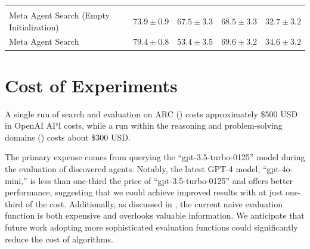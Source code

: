 \begin{table}[h]
{\begin{tabular}{>{\raggedright}p{6cm}cccc}
        \midrule
        \rowcolor{gray!20} \multicolumn{5}{>{\centering\arraybackslash}p{16.3cm}}{\textbf{\problemlong on Different Domains}} \vspace{0.1cm} \\
        Meta Agent Search (Empty Initialization) & \rule{0pt}{2.2ex}$73.9 \pm 0.9$ & $\mathbf{67.5 \pm 3.3}$ & $\mathbf{68.5 \pm 3.3}$ & $\mathbf{32.7 \pm 3.2}$ \\
        Meta Agent Search & \rule{0pt}{2.2ex}$\mathbf{79.4 \pm 0.8}$ & $53.4 \pm 3.5$ & $\mathbf{69.6 \pm 3.2}$ & $\mathbf{34.6 \pm 3.2}$ \\
        \bottomrule
    \end{tabular}}
    \label{tab:empty_init}
\end{table}

\section{Cost of Experiments}
\label{append_section:cost}

A single run of search and evaluation on ARC () costs approximately \$500 USD in OpenAI API costs, while a run within the reasoning and problem-solving domains () costs about \$300 USD.

The primary expense comes from querying the ``gpt-3.5-turbo-0125'' model during the evaluation of discovered agents.
Notably, the latest GPT-4 model, ``gpt-4o-mini,'' is less than one-third the price of ``gpt-3.5-turbo-0125'' and offers better performance, suggesting that we could achieve improved results with \ouralgo at just one-third of the cost. Additionally, as discussed in , the current naive evaluation function is both expensive and overlooks valuable information. We anticipate that future work adopting more sophisticated evaluation functions could significantly reduce the cost of \problem algorithms.
